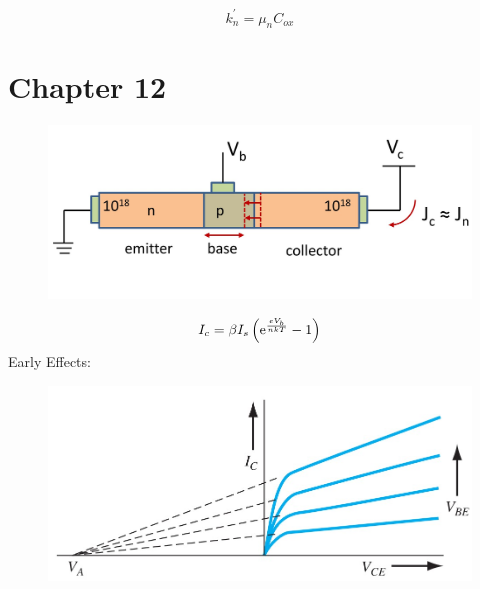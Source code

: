 \documentclass[a4paper, twocolumn]{article}
\begin{document}
    \begin{equation*}
        k_n^\prime = \mu_n C_{ox} 
    \end{equation*} 
\section{Chapter 12}
    \begin{figure}[H]
        \centering
        \includegraphics[width=0.8\linewidth]{BJT-two-pn.jpg}
    \end{figure}
    \begin{equation*}
        \begin{aligned}
            I_c = \beta I_s \left( \mathrm{e}^{\frac{eV_b}{nkT} } - 1 \right)
        \end{aligned}
    \end{equation*}
    Early Effects:
    \begin{figure}[H]
        \centering
        \includegraphics[width=0.8\linewidth]{Early-effect.jpg}
    \end{figure}
\end{document}
